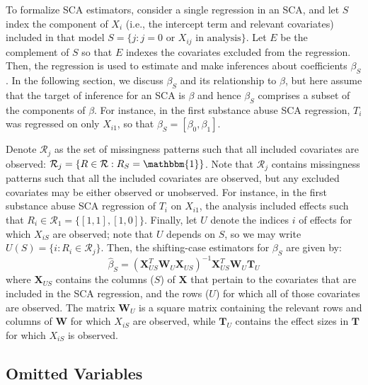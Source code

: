 \documentclass[
]{article}
\begin{document}
To formalize SCA estimators, consider a single regression in an SCA, and let \(S\) index the component of \(X_i\) (i.e., the intercept term and relevant covariates) included in that model \(S = \{j : j = 0 \text{ or } X_{ij} \text{ in analysis}\}\).
Let \(E\) be the complement of \(S\) so that \(E\) indexes the covariates excluded from the regression.
Then, the regression is used to estimate and make inferences about coefficients \(\beta_S\).
In the following section, we discuss \(\beta_S\) and its relationship to \(\beta\), but here assume that the target of inference for an SCA is \(\beta\) and hence \(\beta_S\) comprises a subset of the components of \(\beta\).
For instance, in the first substance abuse SCA regression, \(T_i\) was regressed on only \(X_{i1}\), so that \(\beta_S = [\beta_0, \beta_1]\).

Denote \(\mathcal{R}_j\) as the set of missingness patterns such that all included covariates are observed: \(\mathcal{R}_j = \{R \in \mathcal{R}: R_S = \mathbbm{1}\}\).
Note that \(\mathcal{R}_j\) contains missingness patterns such that all the included covariates are observed, but any excluded covariates may be either observed or unobserved.
For instance, in the first substance abuse SCA regression of \(T_i\) on \(X_{i1}\), the analysis included effects such that \(R_i \in \mathcal{R}_1 = \{[1,1], [1,0]\}\).
Finally, let \(U\) denote the indices \(i\) of effects for which \(X_{iS}\) are observed; note that \(U\) depends on \(S\), so we may write \(U(S) = \{i : R_i \in \mathcal{R}_j\}\).
Then, the shifting-case estimators for \(\beta_S\) are given by:
\begin{equation}
\hat{\beta}_S = 
(\mathbf{X}_{US}^T \mathbf{W}_U \mathbf{X}_{US})^{-1} \mathbf{X}_{US}^T \mathbf{W}_U \mathbf{T}_U
\label{eq:beta-s}
\end{equation}
where \(\mathbf{X}_{US}\) contains the columns (\(S\)) of \(\mathbf{X}\) that pertain to the covariates that are included in the SCA regression, and the rows (\(U\)) for which all of those covariates are observed.
The matrix \(\mathbf{W}_U\) is a square matrix containing the relevant rows and columns of \(\mathbf{W}\) for which \(X_{iS}\) are observed, while \(\mathbf{T}_U\) contains the effect sizes in \(\mathbf{T}\) for which \(X_{iS}\) is observed.

\hypertarget{omitted-variables}{%
\subsection{Omitted Variables}\label{omitted-variables}}
\end{document}
